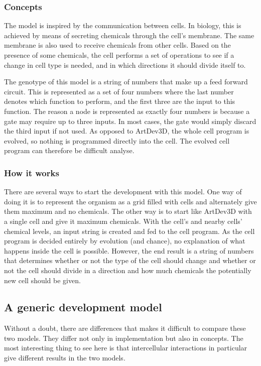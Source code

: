 \subsubsection{Concepts}
The model is inspired by the communication between cells. In biology, this is achieved by means of secreting chemicals through the cell's membrane. The same membrane is also used to receive chemicals from other cells. Based on the presence of some chemicals, the cell performs a set of operations to see if a change in cell type is needed, and in which directions it should divide itself to.

The genotype of this model is a string of numbers that make up a feed forward circuit. This is represented as a set of four numbers where the last number denotes which function to perform, and the first three are the input to this function. The reason a node is represented as exactly four numbers is because a gate may require up to three inputs. In most cases, the gate would simply discard the third input if not used. As opposed to ArtDev3D, the whole cell program is evolved, so nothing is programmed directly into the cell. The evolved cell program can therefore be difficult analyse.

\subsubsection{How it works}
There are several ways to start the development with this model. One way of doing it is to represent the organism as a grid filled with cells and alternately give them maximum and no chemicals. The other way is to start like ArtDev3D with a single cell and give it maximum chemicals. With the cell's and nearby cells' chemical levels, an input string is created and fed to the cell program. As the cell program is decided entirely by evolution (and chance), no explanation of what happens inside the cell is possible. However, the end result is a string of numbers that determines whether or not the type of the cell should change and whether or not the cell should divide in a direction and how much chemicals the potentially new cell should be given.


\subsection{A generic development model}
Without a doubt, there are differences that makes it difficult to compare these two models. They differ not only in implementation but also in concepts. The most interesting thing to see here is that intercellular interactions in particular give different results in the two models.

